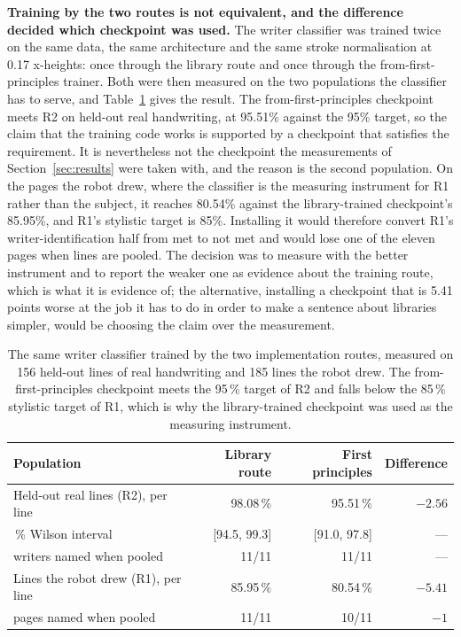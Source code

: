         \textbf{Training by the two routes is not equivalent, and the difference decided which checkpoint was used.}
        The writer classifier was trained twice on the same data, the same architecture and the same stroke normalisation at 0.17 x-heights: once through the library route and once through the from-first-principles trainer.
        Both were then measured on the two populations the classifier has to serve, and Table~\ref{tab:dis-routes} gives the result.
        The from-first-principles checkpoint meets R2 on held-out real handwriting, at 95.51\% against the 95\% target, so the claim that the training code works is supported by a checkpoint that satisfies the requirement.
        It is nevertheless not the checkpoint the measurements of Section~\ref{sec:results} were taken with, and the reason is the second population.
        On the pages the robot drew, where the classifier is the measuring instrument for R1 rather than the subject, it reaches 80.54\% against the library-trained checkpoint's 85.95\%, and R1's stylistic target is 85\%.
        Installing it would therefore convert R1's writer-identification half from met to not met and would lose one of the eleven pages when lines are pooled.
        The decision was to measure with the better instrument and to report the weaker one as evidence about the training route, which is what it is evidence of; the alternative, installing a checkpoint that is 5.41 points worse at the job it has to do in order to make a sentence about libraries simpler, would be choosing the claim over the measurement.

\begin{table}[h]
\centering
\fontsize{10}{12}\selectfont
\begin{tabular}{|l|r|r|r|}
\hline
\textbf{Population} & \textbf{Library route} & \textbf{First principles} & \textbf{Difference} \\
\hline
Held-out real lines (R2), per line   & 98.08\,\% & 95.51\,\% & $-2.56$ \\
\quad 95\,\% Wilson interval          & [94.5, 99.3] & [91.0, 97.8] & --- \\
\quad writers named when pooled       & 11/11 & 11/11 & --- \\
\hline
Lines the robot drew (R1), per line  & 85.95\,\% & 80.54\,\% & $-5.41$ \\
\quad pages named when pooled         & 11/11 & 10/11 & $-1$ \\
\hline
\end{tabular}
\caption{The same writer classifier trained by the two implementation routes,
measured on 156 held-out lines of real handwriting and 185 lines the robot
drew. The from-first-principles checkpoint meets the 95\,\% target of R2 and
falls below the 85\,\% stylistic target of R1, which is why the library-trained
checkpoint was used as the measuring instrument.}
\label{tab:dis-routes}
\end{table}

